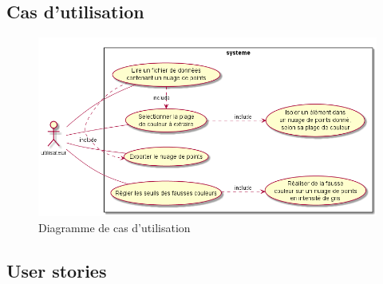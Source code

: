 \documentclass[12pt,titlepage,french]{article}
\begin{document}
\subsection*{Cas d'utilisation}

\begin{figure}
    \centering

    \includegraphics[scale=0.5]{use_cases.png}
    \caption{Diagramme de cas d'utilisation}
\end{figure}

\subsection*{User stories}
\end{document}
